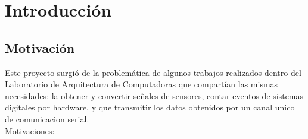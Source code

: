 \chapter{Introducción} %
\label{cha:introduccion}

\section{Motivación} %
\label{sec:motivacion}

Este proyecto surgió de la problemática de algunos trabajos realizados dentro del Laboratorio de Arquitectura de Computadoras que compartían las mismas necesidades: la obtener y convertir señales de sensores, contar eventos de sistemas digitales por hardware, y que transmitir los datos obtenidos por un canal unico de comunicacion serial. \\

Motivaciones: 

